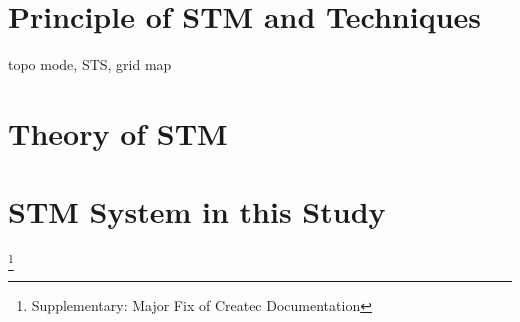 \section{Principle of STM and Techniques}
topo mode, STS, grid map
\section{Theory of STM}
\section{STM System in this Study}
\footnote{Supplementary: Major Fix of Createc Documentation}

